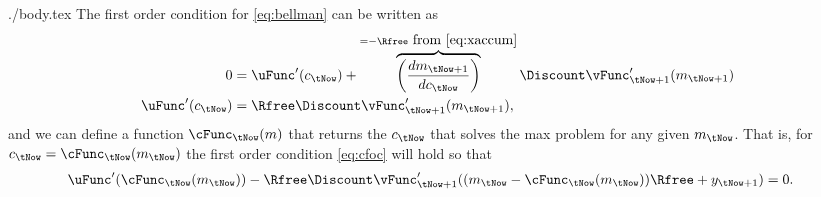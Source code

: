 \documentclass{handout}
\begin{document}
\begin{verbatimwrite}{./body.tex}
The first order condition for \eqref{eq:bellman} can be written
as 
\begin{equation}\begin{gathered}\begin{aligned}
        0 & =  
        \uFunc^{\prime}({c}_{\tNow})+\overbrace{\left(\frac{d {m}_{\tNow+1}}{d {c}_{\tNow}}\right)}^{=-\Rfree~\mbox{from \eqref{eq:xaccum}}}
        \Discount \vFunc_{\tNow+1}^{\prime}({m}_{\tNow+1})
\\  \uFunc^{\prime}({c}_{\tNow}) & =  \Rfree \Discount \vFunc_{\tNow+1}^{\prime}({m}_{\tNow+1}), \label{eq:cfoc}
\end{aligned}\end{gathered}\end{equation}
and we can define a function $\cFunc_{\tNow}({m})$ that returns the
${c}_{\tNow}$ that solves the max problem for any given ${m}_{\tNow}$.  That is,
for ${c}_{\tNow}=\cFunc_{\tNow}({m}_{\tNow})$ the first order condition \eqref{eq:cfoc}
will hold so that
\begin{equation}\begin{gathered}\begin{aligned}
        \uFunc^{\prime}(\cFunc_{\tNow}({m}_{\tNow})) - \Rfree \Discount \vFunc_{\tNow+1}^{\prime}(({m}_{\tNow}-\cFunc_{\tNow}({m}_{\tNow}))\Rfree+{y}_{\tNow+1}) & =  0. \label{eq:cstarfoc}
\end{aligned}\end{gathered}\end{equation}


\end{verbatimwrite}
\end{document}
